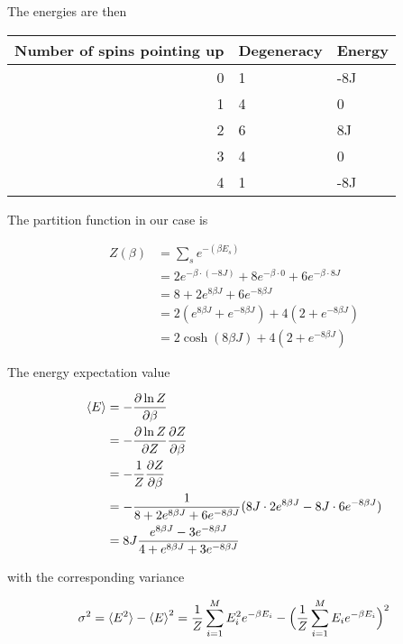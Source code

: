 \documentclass[11pt]{article}
\begin{document}
\begin{flushleft}

The energies are then

\begin{tabular}{r|l|l}
Number of spins pointing up & Degeneracy & Energy\\
\hline
0 & 1 &  -8J\\
1 & 4 & 0\\
2 & 6 & 8J\\
3 & 4 & 0\\
4 & 1 & -8J\\
\end{tabular}

The partition function in our case is

\begin{align*}
Z(\beta) &= \sum_s e^{-(\beta E_s)}\\
&= 2 e^{-\beta \cdot (-8J)} + 8 e^{-\beta \cdot 0} + 6 e^{- \beta \cdot 8J}\\
&= 8 + 2e^{8 \beta J} + 6 e^{-8 \beta J}\\
&= 2(e^{8 \beta J} + e^{-8 \beta J}) + 4( 2+ e^{-8 \beta J})\\
&= 2 \cosh (8 \beta J) + 4( 2+ e^{-8 \beta J}) 
\end{align*}


The energy expectation value

\begin{align*}
\braket{E} & = - \frac{\partial \ln Z}{\partial \beta}\\
&= - \frac{\partial \ln Z}{\partial Z} \frac{\partial Z}{\partial \beta}\\
& = - \frac{1}{Z} \frac{\partial Z}{\partial \beta}\\
& = - \frac{1}{8 + 2e^{8 \beta J} + 6 e^{-8 \beta J}} ( 8J \cdot 2e^{8 \beta J} - 8 J \cdot 6 e^{-8 \beta J})\\
&= 8J \frac{e^{8 \beta J} - 3 e^{-8 \beta J}}{4 + e^{8 \beta J} + 3 e^{-8 \beta J}}
\end{align*}

with the corresponding variance

\begin{align*}
\sigma^2 = \braket{E^2} - \braket{E}^2 = \frac{1}{Z} \sum_{i=1}^M E_i^2 e^{- \beta E_i} - \Big(
\frac{1}{Z} \sum_{i=1}^M E_i e^{- \beta E_i} 
\Big)^2
\end{align*}


\end{flushleft}
\end{document}
